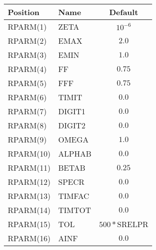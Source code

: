 \begin{center}
\begin{tabular}{|l|l|c|}                       \hline
  Position   &   Name   &   Default     \\    \hline
  RPARM(1)   &   ZETA   &   $10^{-6}$   \\    \hline
  RPARM(2)   &   EMAX   &    $2.0$      \\    \hline
  RPARM(3)   &   EMIN   &    $1.0$      \\    \hline
  RPARM(4)   &   FF     &    $0.75$     \\    \hline
  RPARM(5)   &   FFF    &    $0.75$     \\    \hline
  RPARM(6)   &   TIMIT  &    $0.0$      \\    \hline
  RPARM(7)   &   DIGIT1 &    $0.0$      \\    \hline
  RPARM(8)   &   DIGIT2 &    $0.0$      \\    \hline
  RPARM(9)   &   OMEGA  &    $1.0$      \\    \hline
  RPARM(10)  &   ALPHAB &    $0.0$      \\    \hline
  RPARM(11)  &   BETAB  &    $0.25$     \\    \hline
  RPARM(12)  &   SPECR  &    $0.0$      \\    \hline
  RPARM(13)  &   TIMFAC &    $0.0$      \\    \hline
  RPARM(14)  &   TIMTOT &    $0.0$      \\    \hline
  RPARM(15)  &   TOL    &  $500*\mbox{SRELPR}$  \\    \hline
  RPARM(16)  &   AINF   &    $0.0$      \\    \hline
\end{tabular}
\end{center}


